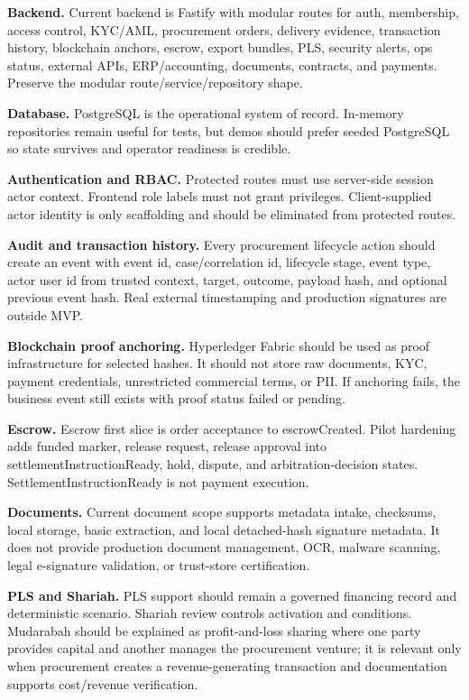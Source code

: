 \documentclass[conference]{IEEEtran}
\begin{document}
\textbf{Backend.} Current backend is Fastify with modular routes for auth, membership, access control, KYC/AML, procurement orders, delivery evidence, transaction history, blockchain anchors, escrow, export bundles, PLS, security alerts, ops status, external APIs, ERP/accounting, documents, contracts, and payments. Preserve the modular route/service/repository shape.

\textbf{Database.} PostgreSQL is the operational system of record. In-memory repositories remain useful for tests, but demos should prefer seeded PostgreSQL so state survives and operator readiness is credible.

\textbf{Authentication and RBAC.} Protected routes must use server-side session actor context. Frontend role labels must not grant privileges. Client-supplied actor identity is only scaffolding and should be eliminated from protected routes.

\textbf{Audit and transaction history.} Every procurement lifecycle action should create an event with event id, case/correlation id, lifecycle stage, event type, actor user id from trusted context, target, outcome, payload hash, and optional previous event hash. Real external timestamping and production signatures are outside MVP.

\textbf{Blockchain proof anchoring.} Hyperledger Fabric should be used as proof infrastructure for selected hashes. It should not store raw documents, KYC, payment credentials, unrestricted commercial terms, or PII. If anchoring fails, the business event still exists with proof status failed or pending.

\textbf{Escrow.} Escrow first slice is order acceptance to escrowCreated. Pilot hardening adds funded marker, release request, release approval into settlementInstructionReady, hold, dispute, and arbitration-decision states. SettlementInstructionReady is not payment execution.

\textbf{Documents.} Current document scope supports metadata intake, checksums, local storage, basic extraction, and local detached-hash signature metadata. It does not provide production document management, OCR, malware scanning, legal e-signature validation, or trust-store certification.

\textbf{PLS and Shariah.} PLS support should remain a governed financing record and deterministic scenario. Shariah review controls activation and conditions. Mudarabah should be explained as profit-and-loss sharing where one party provides capital and another manages the procurement venture; it is relevant only when procurement creates a revenue-generating transaction and documentation supports cost/revenue verification.
\end{document}

